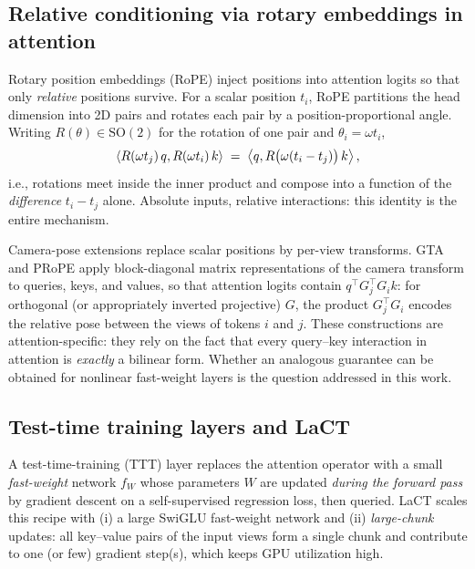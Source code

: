 \subsection{Relative conditioning via rotary embeddings in attention}
\label{sec:prelim-rope}

Rotary position embeddings (RoPE) inject positions
into attention logits so that only \emph{relative} positions survive.
For a scalar position $t_i$, RoPE partitions the head dimension into 2D
pairs and rotates each pair by a position-proportional angle. Writing
$R(\theta) \in \mathrm{SO}(2)$ for the rotation of one pair and
$\theta_i = \omega t_i$,
\begin{equation}
\label{eq:rope-identity}
\left\langle R(\omega t_j)\, q, R(\omega t_i)\, k \right\rangle
  \;=\;
\left\langle q, R\big(\omega (t_i - t_j)\big)\, k \right\rangle,
\end{equation}
i.e., rotations meet inside the inner product and compose into a function of
the \emph{difference} $t_i - t_j$ alone. Absolute inputs, relative
interactions: this identity is the entire mechanism.

Camera-pose extensions replace scalar positions by per-view transforms. GTA
and PRoPE apply block-diagonal matrix representations
of the camera transform to queries, keys, and values, so that attention
logits contain $q^\top G_j^\top G_i k$: for orthogonal (or appropriately
inverted projective) $G$, the product $G_j^\top G_i$ encodes the relative
pose between the views of tokens $i$ and $j$. These constructions are
attention-specific: they rely on the fact that every query--key interaction
in attention is \emph{exactly} a bilinear form. Whether an analogous
guarantee can be obtained for nonlinear fast-weight layers is the question
addressed in this work.

\subsection{Test-time training layers and LaCT}
\label{sec:prelim-lact}

A test-time-training (TTT) layer replaces the
attention operator with a small \emph{fast-weight} network $f_W$ whose
parameters $W$ are updated \emph{during the forward pass} by gradient
descent on a self-supervised regression loss, then queried. LaCT
scales this recipe with (i) a large SwiGLU
fast-weight network and (ii) \emph{large-chunk} updates: all key--value
pairs of the input views form a single chunk and contribute to one
(or few) gradient step(s), which keeps GPU utilization high.


